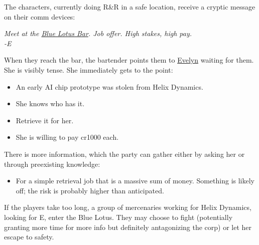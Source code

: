 The characters, currently doing R\&R in a safe location,
receive a cryptic message on their comm devices:
\begin{exampleblock}
	\itshape
	Meet at the \hyperref[location:bar]{Blue Lotus Bar}.
	Job offer. High stakes, high pay.
	\\%
	-E
\end{exampleblock}
When they reach the bar, the bartender points them to \hyperref[char:E]{Evelyn} waiting for them.
She is visibly tense.
She immediately gets to the point:
\begin{itemize}
	\vspace{-10mm}
	\setlength\itemsep{-10mm}
	\item An early AI chip prototype was stolen from Helix Dynamics.
	\item She knows who has it.
	\item Retrieve it for her.
	\item She is willing to pay cr1000 each.
\end{itemize}

There is more information,
	which the party can gather either by asking her
	or through preexisting knowledge:
\begin{itemize}
	\vspace{-10mm}
	\setlength\itemsep{-10mm}
	\item For a simple retrieval job that is a massive sum of money.
		Something is likely off; the risk is probably higher than anticipated.
\end{itemize}

If the players take too long,
	a group of mercenaries working for Helix Dynamics,
	looking for E,
	enter the Blue Lotus.
They may choose to fight
	(potentially granting more time for more info
	but definitely antagonizing the corp)
	or let her escape to safety.

